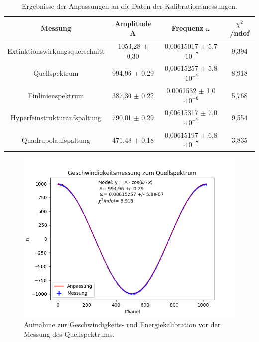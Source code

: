 \documentclass[12pt,a4paper]{article}
\begin{document}
\begin{table}
\centering
\begin{tabular}{|c|c|c|c|}
\hline 
Messung & Amplitude A & Frequenz $\omega$ & $\chi ^2$/ndof \\ 
\hline 
Extinktionswirkungsquerschnitt & 1053,28 $\pm$ 0,30 & 0,00615017 $\pm$ 5,7 $\cdot 10^{-7}$ & 9,394  \\
\hline 
Quellspektrum & 994,96 $\pm$ 0,29 & 0,00615257 $\pm$ 5,8 $\cdot 10^{-7}$ & 8,918 \\
\hline 
Einlinienspektrum & 387,30 $\pm$ 0,22 & 0,0061532 $\pm$ 1,0 $\cdot 10^{-6}$ & 5,768  \\
\hline 
Hyperfeinstrukturaufspaltung & 790,01 $\pm$ 0,29 & 0,00615317 $\pm$ 7,0 $\cdot 10^{-7}$ & 9,554  \\
\hline 
Quadrupolaufspaltung & 471,48 $\pm$ 0,18 & 0,00615197 $\pm$ 6,8 $\cdot 10^{-7}$ & 3,835 \\
\hline 
\end{tabular} 
\caption{Ergebnisse der Anpassungen an die Daten der Kalibrationsmessungen.}
\label{tab:Kalibration_Fitergebnisse}
\end{table}

\begin{figure}
\centering
\includegraphics[scale=0.8]{Bilder/Kalibration/Quellspektrum.png}
\caption{Aufnahme zur Geschwindigkeits- und Energiekalibration vor der Messung des Quellspektrums.}
\label{fig:Kalibration_Beispiel}
\end{figure}
\end{document}
